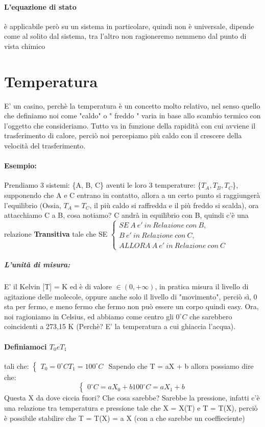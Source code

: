 \documentclass[12pt, a4paper, openany, oneside]{book}
\begin{document}
\paragraph{L'equazione di stato} è applicabile però su un sistema in particolare,
quindi non è universale, dipende come al solito dal sistema, tra l'altro non 
ragioneremo nemmeno dal punto di vista chimico
\section{Temperatura}
E' un casino, perchè la temperatura è un concetto molto relativo, nel senso
quello che definiamo noi come "\color{red}caldo\color{black}" o "\color{blue} 
freddo\color{black}
" varia in base allo scambio termico con l'oggetto che consideriamo. Tutto va in
funzione della rapidità con cui avviene il trasferimento di calore, perciò noi
percepiamo più caldo con il crescere della velocità del trasferimento. 
\paragraph{Esempio: }
Prendiamo 3 sistemi: \{A, B, C\} aventi le loro 3 temperature: \{$T_{A}, T_{B}
, T_{C}$\}, supponendo che A e C entrano in contatto, allora a un certo punto
si raggiungerà l'equilibrio (Ossia, $T_{A} = T_{C}$, il più caldo si raffredda
e il più freddo si scalda), ora attacchiamo C a B, 
cosa notiamo? C andrà in equilibrio con B, quindi c'è una relazione \textbf{
	Transitiva
} tale che SE $
\begin{cases}
	SE ~ A ~ e' ~ in ~ Relazione ~ con ~ B, \\B ~ e' ~ in ~ Relazione ~ con ~
     C, \\ALLORA ~ A ~ e' ~ in ~ Relazione ~ con ~ C 
\end{cases}$ 
\subparagraph{L'unità di misura: }E' il Kelvin [T] = K ed è di valore $\in (0, 
+\infty)$, in pratica misura il livello di agitazione delle molecole, oppure 
anche solo il livello di "movimento", perciò sì, 0 sta per fermo, e meno fermo
che fermo non può essere un corpo quindi easy. 
Ora, noi ragioniamo in Celsius, ed abbiamo come centro gli $0^{\circ}C$ 
che sarebbero 
coincidenti a 273,15 K (Perchè? E' la temperatura a cui ghiaccia l'acqua). 
\paragraph{Definiamoci $T_{0} e T_{1}$} tali che:
$
\begin{cases}
T_{0} = 0^{\circ}C	
T_{1} = 100^{\circ}C
\end{cases}
$
Sapendo che T = aX + b allora possiamo dire che:
\[
\begin{cases}
0^{\circ}C	= a X_{0} + b
100^{\circ}C = a X_{1} + b
\end{cases}
\]
Questa X da dove ciccia fuori? Che cosa sarebbe? Sarebbe la pressione, infatti
c'è una relazione tra temperatura e pressione tale che X = X(T) e T = T(X),
perciò è possibile stabilire che T = T(X) = a X (con a che sarebbe un coeffieciente)

    
\end{document}

